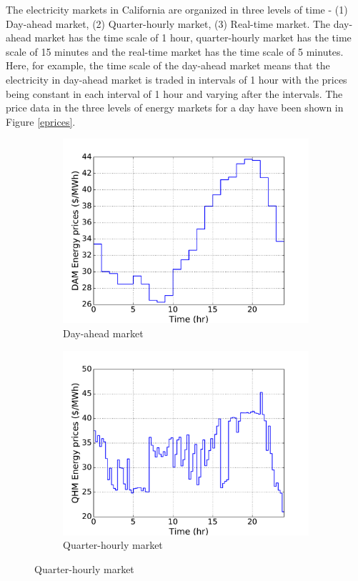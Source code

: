 \documentclass[11pt,twoside]{article}
\begin{document}
The electricity markets in California are organized in three levels of time - (1) Day-ahead market, (2) Quarter-hourly market, (3) Real-time market. The  day-ahead market has the time scale of 1 hour, quarter-hourly market has the time scale of 15 minutes and the real-time market has the time scale of 5 minutes. Here, for example, the time scale of the day-ahead market means that the electricity in day-ahead market is traded in intervals of 1 hour with the prices being constant in each interval of 1 hour and varying after the intervals. The price data in the three levels of energy markets for a day have been shown in Figure \ref{eprices}.
\begin{figure}[h!tp]
\centering
\begin{subfigure}[b]{0.32\textwidth} \includegraphics[width=\textwidth]{Figures/damprices.pdf} \caption{Day-ahead market}\label{damprices} \end{subfigure} \hfill
\begin{subfigure}[b]{0.32\textwidth} \includegraphics[width=\textwidth]{Figures/qhmprices.pdf} \caption{Quarter-hourly market}\label{qhmprices} \end{subfigure} \hfill

\end{figure}
\end{document}
